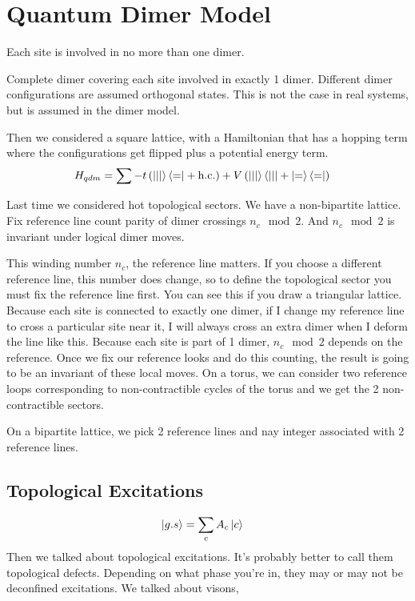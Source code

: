 \section{Quantum Dimer Model}
Each site is involved in no more than one dimer.

Complete dimer covering each site involved in exactly 1 dimer.
Different dimer configurations are assumed orthogonal states.
This is not the case in real systems,
but is assumed in the dimer model.

Then we considered a square lattice,
with a Hamiltonian that has a hopping term where the configurations get flipped
plus a potential energy term.
\begin{align}
    H_{qdm} &=
    \sum -t \left( \ket{||}\bra{=} + \mathrm{h.c.} \right)
    +
    V\left( 
    \ket{||} \bra{||} + \ket{=}\bra{=}
    \right)
\end{align}


Last time we considered hot topological sectors.
We have a non-bipartite lattice.
Fix reference line count parity of dimer crossings $n_c\mod 2$.
And $n_c\mod 2$ is invariant under logical dimer moves.

This winding number $n_c$,
the reference line matters.
If you choose a different reference line,
this number does change,
so to define the topological sector you must fix the reference line first.
You can see this if you draw a triangular lattice.
Because each site is connected to exactly one dimer,
if I change my reference line to cross a particular site near it,
I will always cross an extra dimer when I deform the line like this.
Because each site is part of 1 dimer,
$n_c\mod 2$ depends on the reference.
Once we fix our reference looks and do this counting,
the result is going to be an invariant of these local moves.
On a torus,
we can consider two reference loops corresponding to non-contractible cycles of
the torus and we get the 2 non-contractible sectors.

On a bipartite lattice,
we pick 2 reference lines and nay integer associated with 2 reference lines.


\subsection{Topological Excitations}
\begin{align}
    \ket{g.s}
    &=
    \sum_c A_c \ket{c}
\end{align}
Then we talked about topological excitations.
It's probably better to call them topological defects.
Depending on what phase you're in,
they may or may not be deconfined excitations.
We talked about visons,


